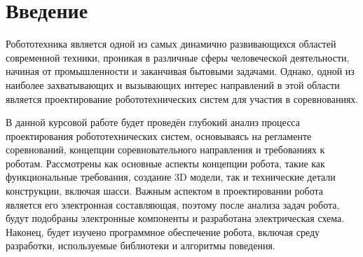 \chapter*{Введение}
Робототехника является одной из самых динамично развивающихся областей современной техники, проникая в различные сферы человеческой деятельности, начиная от промышленности и заканчивая бытовыми задачами. Однако, одной из наиболее захватывающих и вызывающих интерес направлений в этой области является проектирование робототехнических систем для участия в соревнованиях.

В данной курсовой работе будет проведён глубокий анализ процесса проектирования робототехнических систем, основываясь на регламенте соревнований, концепции соревновательного направления и требованиях к роботам. Рассмотрены как основные аспекты концепции робота, такие как функциональные требования, создание 3D модели, так и технические детали конструкции, включая шасси. Важным аспектом в проектировании робота является его электронная составляющая, поэтому после анализа задач робота, будут подобраны электронные компоненты и разработана электрическая схема. Наконец, будет изучено программное обеспечение робота, включая среду разработки, используемые библиотеки и алгоритмы поведения.
